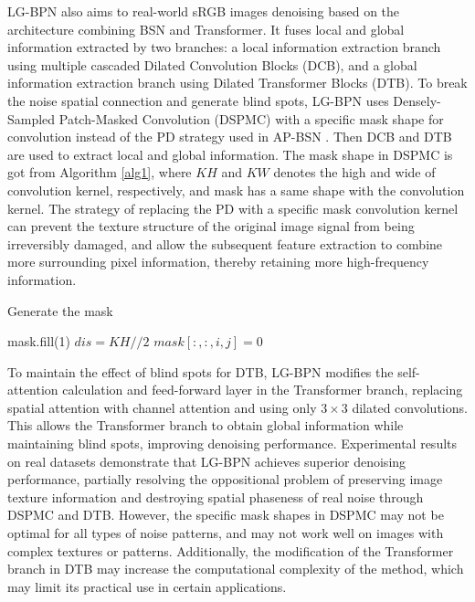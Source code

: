 \documentclass[conference]{IEEEtran}
\begin{document}
LG-BPN \cite{wang2023lg} also aims to real-world sRGB images denoising based on the architecture combining BSN and Transformer. It fuses local and global information extracted by two branches: a local information extraction branch using multiple cascaded Dilated Convolution Blocks (DCB), and a global information extraction branch using Dilated Transformer Blocks (DTB). To break the noise spatial connection and generate blind spots, LG-BPN uses Densely-Sampled Patch-Masked Convolution (DSPMC) with a specific mask shape for convolution instead of the PD strategy used in AP-BSN \cite{lee2022ap}. Then DCB and DTB are used to extract local and global information.
The mask shape in DSPMC is got from Algorithm \ref{alg1}, where $KH$ and $KW$ denotes the high and wide of convolution kernel, respectively, and mask has a same shape with the convolution kernel. The strategy of replacing the PD with a specific mask convolution kernel can prevent the texture structure of the original image signal from being irreversibly damaged, and allow the subsequent feature extraction to combine more surrounding pixel information, thereby retaining more high-frequency information.
\begin{algorithm}
	\renewcommand{\algorithmicrequire}{\textbf{Input:}}
	\renewcommand{\algorithmicensure}{\textbf{Output:}}
	\caption{Generate the mask}
	\label{alg1}  
	\begin{algorithmic}
		\STATE mask.fill(1)
		\STATE $ dis = KH//2$
		\STATE $mask[:, :, i, j]=0$ 
		\ENDIF 
		\ENDFOR
		\ENDFOR 
	\end{algorithmic} 
\end{algorithm}
To maintain the effect of blind spots for DTB, LG-BPN modifies the self-attention calculation and feed-forward layer in the Transformer branch, replacing spatial attention with channel attention and using only $3 \times 3$ dilated convolutions. This allows the Transformer branch to obtain global information while maintaining blind spots, improving denoising performance.
Experimental results on real datasets demonstrate that LG-BPN achieves superior denoising performance, partially resolving the oppositional problem of preserving image texture information and destroying spatial phaseness of real noise through DSPMC and DTB. However, the specific mask shapes in DSPMC may not be optimal for all types of noise patterns, and may not work well on images with complex textures or patterns. Additionally, the modification of the Transformer branch in DTB may increase the computational complexity of the method, which may limit its practical use in certain applications. 
\end{document}
